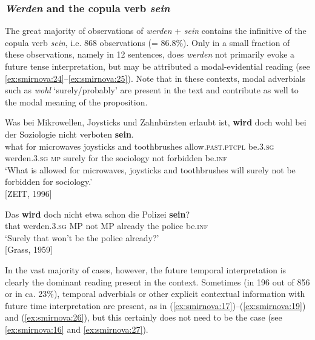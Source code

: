\documentclass[output=paper,colorlinks,citecolor=brown]{langscibook}
\begin{document}
\subsubsection{\emph{Werden} and the copula verb \emph{sein}} \label{sec:smirnova:4.2.3}
The great majority of observations of \emph{werden} + \emph{sein} contains the infinitive of the copula verb \emph{sein}, i.e. 868 observations (= 86.8\%). Only in a small fraction of these observations, namely in 12 sentences, does \emph{werden} not primarily evoke a future tense interpretation, but may be attributed a modal-evidential reading (see \ref{ex:smirnova:24}–\ref{ex:smirnova:25}). Note that in these contexts, modal adverbials such as \emph{wohl} `surely/probably' are present in the text and contribute as well to the modal meaning of the proposition.

\ea\label{ex:smirnova:24}
\gll Was bei Mikrowellen, Joysticks und Zahnbürsten erlaubt ist, \textbf{wird} doch wohl bei der Soziologie nicht verboten \textbf{sein}. \\
    what for microwaves joysticks and toothbrushes allow.\textsc{past.ptcpl} be.\textsc{3.sg} werden.\textsc{3.sg} \textsc{mp}{\footnotemark} surely for the sociology not forbidden be.\textsc{inf}\\
\glt `What is allowed for microwaves, joysticks and toothbrushes will surely not be forbidden for sociology.'\\
\hfill [ZEIT, 1996]
\z

\ea\label{ex:smirnova:25}
\gll Das \textbf{wird} doch nicht etwa schon die Polizei \textbf{sein}? \\
    that werden.\textsc{3.sg} MP not MP already the police be.\textsc{inf} \\
\glt `Surely that won't be the police already?'\\
\hfill [Grass, 1959]
\z

In the vast majority of cases, however, the future temporal interpretation is clearly the dominant reading present in the context. Sometimes (in 196 out of 856 or in ca. 23\%), temporal adverbials or other explicit contextual information with future time interpretation are present, as in (\ref{ex:smirnova:17})–(\ref{ex:smirnova:19}) and (\ref{ex:smirnova:26}), but this certainly does not need to be the case (see \ref{ex:smirnova:16} and \ref{ex:smirnova:27}). 
\end{document}
